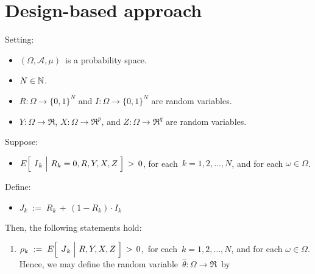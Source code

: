 

\section{Design-based approach}
\setcounter{theorem}{0}
\setcounter{equation}{0}


\renewcommand{\theenumi}{\roman{enumi}}
\renewcommand{\labelenumi}{\textnormal{(\theenumi)}$\;\;$}



\begin{proposition}
\mbox{}
\vskip 0.1cm
\noindent
Setting:
\begin{itemize}
\item
	$(\Omega,\mathcal{A},\mu)$\, is a probability space.
\item
	$N \in \mathbb{N}$.
\item
	$R : \Omega \longrightarrow \{0,1\}^{N}$\; and
	$I : \Omega \longrightarrow \{0,1\}^{N}$
	are random variables.
\item
	$Y : \Omega \longrightarrow \Re$,\;
	$X : \Omega \longrightarrow \Re^{p}$,\; and\;
	$Z : \Omega \longrightarrow \Re^{q}$
	are random variables.
\end{itemize}
Suppose:
\begin{itemize}
\item
	$E\!\left[\;\left.\overset{{\color{white}.}}{I}_{k}\;\right\vert\,R_{k}=0,R,Y,X,Z\;\right] \, > \, 0$,\;
	for each \,$k = 1, 2, \ldots, N$, and for each $\omega \in \Omega$.
\end{itemize}
\vskip 0.3cm
\noindent
Define:
\begin{itemize}
\item
	$J_{k} \; := \; R_{k} \, + \, (1-R_{k}) \cdot I_{k}$
\end{itemize}
\vskip 0.3cm
\noindent
Then, the following statements hold:
\begin{enumerate}
\item
	$\rho_{k} \; := \; E\!\left[\;\left.\overset{{\color{white}.}}{J}_{k}\;\right\vert\,R,Y,X,Z\;\right] \, > \, 0$,\,
	for each \,$k = 1, 2, \ldots, N$, and for each $\omega \in \Omega$.
	\vskip 0.05cm
	\noindent
	Hence, we may define the random variable
	\,$\widehat{\theta} : \Omega \longrightarrow \Re$\,
	by
	\begin{equation*}

\end{equation*}
\end{enumerate}
\end{proposition}
